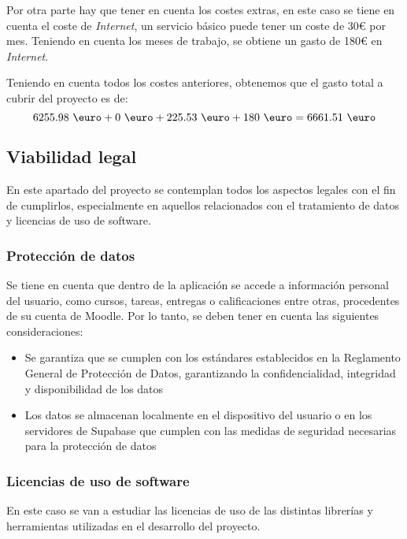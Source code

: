 Por otra parte hay que tener en cuenta los costes extras, en este caso se tiene en cuenta el coste de \textit{Internet}, un servicio básico puede tener un coste de 30€ por mes. Teniendo en cuenta los meses de trabajo, se obtiene un gasto de 180€ en \textit{Internet}.

Teniendo en cuenta todos los costes anteriores, obtenemos que el gasto total a cubrir del proyecto es de:
\begin{equation}
    6255.98\ \text{\euro} + 0\ \text{\euro} + 225.53\ \text{\euro} + 180\ \text{\euro}  = 6661.51\ \text{\euro}
\end{equation}

\subsection{Viabilidad legal}
En este apartado del proyecto se contemplan todos los aspectos legales con el fin de cumplirlos, especialmente en aquellos relacionados con el tratamiento de datos y licencias de uso de software.

\subsubsection{Protección de datos}
Se tiene en cuenta que dentro de la aplicación se accede a información personal del usuario, como cursos, tareas, entregas o calificaciones entre otras, procedentes de su cuenta de Moodle. Por lo tanto, se deben tener en cuenta las siguientes consideraciones:
\begin{itemize}
    \item Se garantiza que se cumplen con los estándares establecidos en la Reglamento General de Protección de Datos, garantizando la confidencialidad, integridad y disponibilidad de los datos
    \item Los datos se almacenan localmente en el dispositivo del usuario o en los servidores de Supabase que cumplen con las medidas de seguridad necesarias para la protección de datos
\end{itemize}

\subsubsection{Licencias de uso de software}
En este caso se van a estudiar las licencias de uso de las distintas librerías y herramientas utilizadas en el desarrollo del proyecto.

